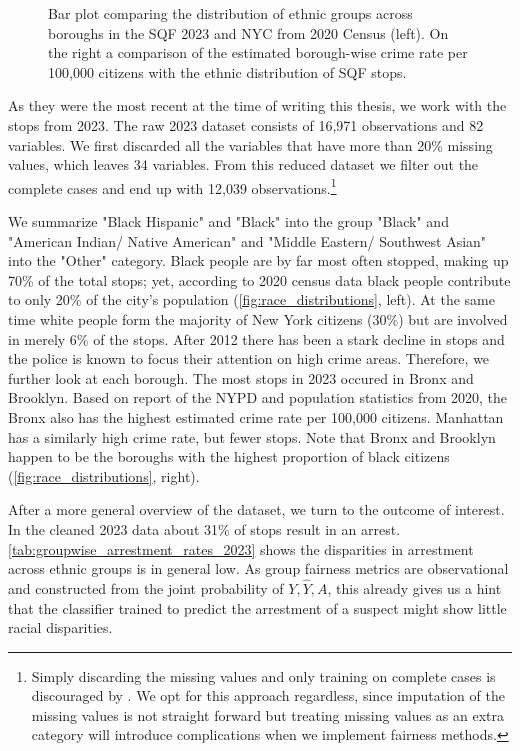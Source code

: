 \begin{figure}
\begin{minipage}{0.49\textwidth}
  \end{minipage}
  \caption{Bar plot comparing the distribution of ethnic groups across boroughs in the SQF 2023 and NYC from 2020 Census (left). On the right a comparison of the estimated borough-wise crime rate per 100,000 citizens with the ethnic distribution of SQF stops.}
  \label{fig:race_distributions}
\end{figure}

As they were the most recent at the time of writing this thesis, we work with the stops from 2023. The raw 2023 dataset consists of 16,971 observations and 82 variables. We first discarded all the variables that have more than 20\% missing values, which leaves 34 variables.
From this reduced dataset we filter out the complete cases and end up with 12,039 observations.\footnote{Simply discarding the missing values and only training on complete cases is discouraged by \cite{fernando2021}. We opt for this approach regardless, since imputation of the missing values is not straight forward
but treating missing values as an extra category will introduce complications when we implement fairness methods.}\par

We summarize "Black Hispanic" and "Black" into the group "Black" and  "American Indian/ Native American" and "Middle Eastern/ Southwest Asian" into the "Other" category. Black people are by far most often stopped, making up 70\% of the total stops; yet, according to 2020 census data black people contribute to only 20\% of the city's population (\autoref{fig:race_distributions}, left). At the same time white people form the majority of New York citizens (30\%) but are involved in merely 6\% of the stops. 
After 2012 there has been a stark decline in stops and the police is known to focus their attention on high crime areas. Therefore, we further look at each borough. 
The most stops in 2023 occured in Bronx and Brooklyn. Based on report of the NYPD and population statistics from 2020, the Bronx also has the highest estimated crime rate per 100,000 citizens. Manhattan has a similarly high crime rate, but fewer stops. Note that Bronx and Brooklyn happen to be the boroughs with the highest proportion of black citizens (\autoref{fig:race_distributions}, right).\par

After a more general overview of the dataset, we turn to the outcome of interest. In the cleaned 2023 data about 31\% of stops result in an arrest.
\autoref{tab:groupwise_arrestment_rates_2023} shows the disparities in arrestment across ethnic groups is in general low.
As group fairness metrics are observational and constructed from the joint probability of $Y, \hat{Y}, A$, this already gives us a hint that the classifier trained to predict the arrestment of a suspect might show little racial disparities.

